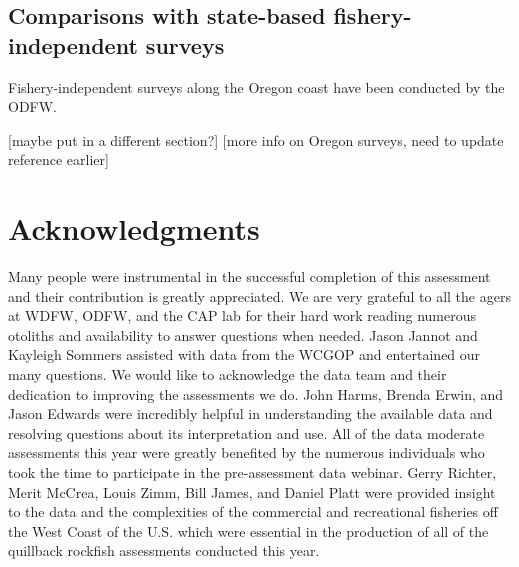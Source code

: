 \documentclass[11pt,
  english,
  a4paper,
]{article}
\begin{document}

\hypertarget{comparisons-with-state-based-fishery-independent-surveys}{%
\subsection{Comparisons with state-based fishery-independent surveys}\label{comparisons-with-state-based-fishery-independent-surveys}}

\leavevmode\tagmcend\tagstructend


Fishery-independent surveys along the Oregon coast have been conducted by the ODFW.

\leavevmode\tagmcend\tagstructend\par


{[}maybe put in a different section?{]} {[}more info on Oregon surveys, need to update reference earlier{]}

\leavevmode\tagmcend\tagstructend\par


\hypertarget{acknowledgments}{%
\section{Acknowledgments}\label{acknowledgments}}

\leavevmode\tagmcend\tagstructend


Many people were instrumental in the successful completion of this assessment and their contribution is greatly appreciated. We are very grateful to all the agers at WDFW, ODFW, and the CAP lab for their hard work reading numerous otoliths and availability to answer questions when needed. Jason Jannot and Kayleigh Sommers assisted with data from the WCGOP and entertained our many questions. We would like to acknowledge the data team and their dedication to improving the assessments we do. John Harms, Brenda Erwin, and Jason Edwards were incredibly helpful in understanding the available data and resolving questions about its interpretation and use. All of the data moderate assessments this year were greatly benefited by the numerous individuals who took the time to participate in the pre-assessment data webinar. Gerry Richter, Merit McCrea, Louis Zimm, Bill James, and Daniel Platt were provided insight to the data and the complexities of the commercial and recreational fisheries off the West Coast of the U.S. which were essential in the production of all of the quillback rockfish assessments conducted this year.
\end{document}
